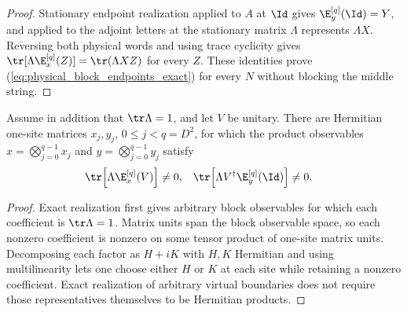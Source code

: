 \begin{proof}
    \leanok
    Stationary endpoint realization applied to $A$ at $\Id$ gives
    $\E_y^{[q]}(\Id)=Y$, and applied to the adjoint letters at the stationary
    matrix $\Lambda$ represents $\Lambda X$. Reversing both physical
    words and using trace cyclicity gives
    $\tr[\Lambda\E_x^{[q]}(Z)]=\tr(\Lambda XZ)$ for every $Z$.
    These identities prove (\ref{eq:physical_block_endpoints_exact}) for
    every $N$ without blocking the middle string.
\end{proof}

\begin{lemma}
    \label{thm:physical_block_product_coefficients}
    \leanok
    Assume in addition that $\tr\Lambda=1$, and let $V$ be unitary.
    There are Hermitian one-site matrices $x_j,y_j$, $0\le j<q=D^2$,
    for which the product observables
    $x=\bigotimes_{j=0}^{q-1}x_j$ and $y=\bigotimes_{j=0}^{q-1}y_j$ satisfy
    \begin{align}
        \tr\!\left[\Lambda\E_x^{[q]}(V)\right] & \ne0,
                                               & \tr\!\left[\Lambda V^\dagger\E_y^{[q]}(\Id)\right] & \ne0.
        \notag
    \end{align}
\end{lemma}
\begin{proof}
    \leanok
    Exact realization first gives arbitrary block observables for which
    each coefficient is $\tr\Lambda=1$. Matrix units span the block
    observable space, so each nonzero coefficient is nonzero on some tensor
    product of one-site matrix units. Decomposing each factor as $H+iK$ with
    $H,K$ Hermitian and using multilinearity lets one choose either $H$ or $K$
    at each site while retaining a nonzero coefficient. Exact realization of
    arbitrary virtual boundaries does not require those representatives
    themselves to be Hermitian products.
\end{proof}

